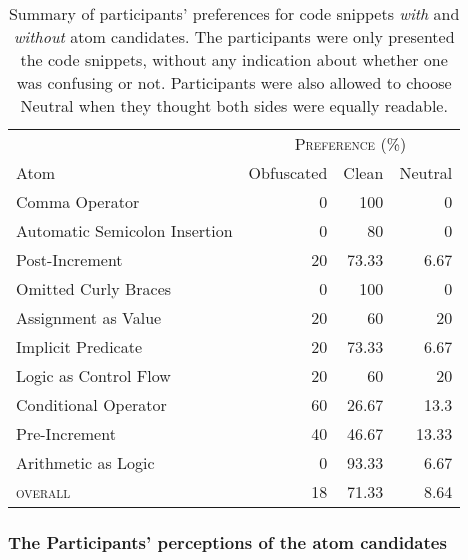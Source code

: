 \begin{table}[!htb]
    \centering
    {\scriptsize
    \caption{Summary of participants' preferences for code snippets \emph{with} and
      \emph{without} atom candidates. The participants were only presented the code snippets, without any indication about whether one was confusing or not. 
      Participants were also allowed to choose Neutral when they thought both sides were equally readable.}\label{tab:interview-results1}
    \begin{tabular}{lrrr}\toprule
      & \multicolumn{3}{c}{\textsc{Preference (\%)}} \\
      \cmidrule(lr){2-4}
         Atom           & \multicolumn{1}{c}{Obfuscated}
                                      &  \multicolumn{1}{c}{Clean}
                                               & \multicolumn{1}{c}{Neutral} \\ \midrule
         Comma Operator                  & 0  & 100    & 0     \\
         Automatic Semicolon Insertion  & 0  & 80     & 0     \\
         Post-Increment                  & 20 & 73.33  & 6.67  \\
         Omitted Curly Braces            & 0  & 100    & 0     \\
         Assignment as Value             & 20 & 60     & 20    \\
         Implicit Predicate              & 20 & 73.33  & 6.67  \\
         Logic as Control Flow           & 20 & 60     & 20    \\
         Conditional Operator                & 60 & 26.67  & 13.3  \\
         Pre-Increment                   & 40 & 46.67  & 13.33 \\ 
         Arithmetic as Logic             & 0  & 93.33  & 6.67  \\ \midrule
         \textsc{overall}                & 18 & 71.33  & 8.64  \\
         \bottomrule
    \end{tabular}
    }

\end{table}

\subsubsection{The Participants' perceptions of the atom candidates} 

